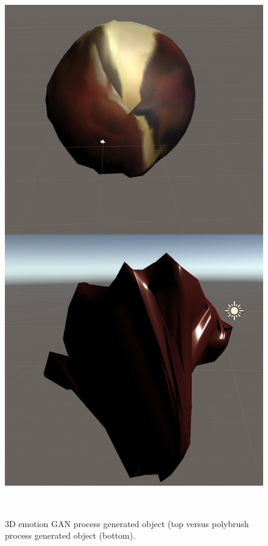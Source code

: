 \documentclass{sigchi}
\begin{document}
\begin{figure}
  \centering
  \includegraphics[width=0.75\columnwidth]{figures/angryimages}
  \caption[width=0.5\columnwidth]{3D emotion GAN process generated object (top
  versus polybrush process generated object (bottom).}~\label{fig:figure4}
\end{figure}
\end{document}
